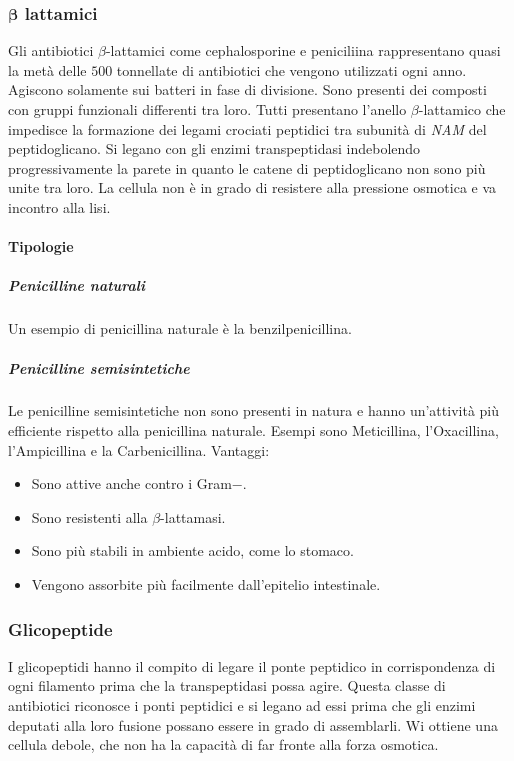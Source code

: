		\subsubsection{$\mathbf{\beta}$ lattamici}
		Gli antibiotici $\beta$-lattamici come cephalosporine e peniciliina rappresentano quasi la metà delle $500$ tonnellate di antibiotici che vengono utilizzati ogni anno. 
		Agiscono solamente sui batteri in fase di divisione. 
		Sono presenti dei composti con gruppi funzionali differenti tra loro. 
		Tutti presentano l'anello $\beta$-lattamico che impedisce la formazione dei legami crociati peptidici tra subunità di \emph{NAM} del peptidoglicano. 
		Si legano con gli enzimi transpeptidasi indebolendo progressivamente la parete in quanto le catene di peptidoglicano non sono più unite tra loro.
		La cellula non è in grado di resistere alla pressione osmotica e va incontro alla lisi.

			\paragraph{Tipologie}

				\subparagraph{Penicilline naturali}
				Un esempio di penicillina naturale \`e la benzilpenicillina.

				\subparagraph{Penicilline semisintetiche}
				Le penicilline semisintetiche non sono presenti in natura e hanno un'attivit\`a pi\`u efficiente rispetto alla penicillina naturale.
				Esempi sono Meticillina, l'Oxacillina, l'Ampicillina e la Carbenicillina.  
				Vantaggi:
				\begin{multicols}{2}
    					\begin{itemize}
        					\item Sono attive anche contro i Gram$-$. 
        					\item Sono resistenti alla $\beta$-lattamasi. 
        					\item Sono più stabili in ambiente acido, come lo stomaco. 
        					\item Vengono assorbite più facilmente dall'epitelio intestinale.
    					\end{itemize}
				\end{multicols}
		\subsubsection{Glicopeptide}
		I glicopeptidi hanno il compito di legare il ponte peptidico in corrispondenza di ogni filamento prima che la transpeptidasi possa agire. 
		Questa classe di antibiotici riconosce i ponti peptidici e si legano ad essi prima che gli enzimi deputati alla loro fusione possano essere in grado di assemblarli. 
		Wi ottiene una cellula debole, che non ha la capacità di far fronte alla forza osmotica.

